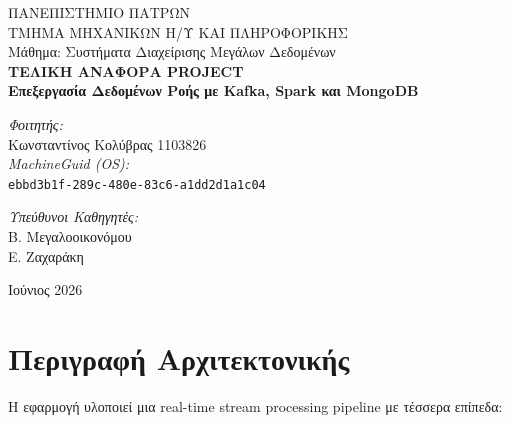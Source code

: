 \documentclass[11pt,a4paper]{article}
\begin{document}

\begin{titlepage}
    \centering
    \vspace*{1.5cm}
    {\large ΠΑΝΕΠΙΣΤΗΜΙΟ ΠΑΤΡΩΝ}\\[0.2cm]
    {\large ΤΜΗΜΑ ΜΗΧΑΝΙΚΩΝ Η/Υ ΚΑΙ ΠΛΗΡΟΦΟΡΙΚΗΣ}\\[1.5cm]
    {\large Μάθημα: Συστήματα Διαχείρισης Μεγάλων Δεδομένων}\\[2cm]
    {\Large \bfseries ΤΕΛΙΚΗ ΑΝΑΦΟΡΑ \textlatin{PROJECT}}\\[0.5cm]
    {\Large \bfseries Επεξεργασία Δεδομένων Ροής με \textlatin{Kafka}, \textlatin{Spark} και \textlatin{MongoDB}}\\[2.5cm]
    \begin{minipage}{0.45\textwidth}
        \begin{flushleft}\large
            \emph{Φοιτητής:}\\
            Κωνσταντίνος Κολύβρας 1103826\\[0.3cm]
            \emph{\textlatin{MachineGuid (OS)}:}\\
            \texttt{\textlatin{ebbd3b1f-289c-480e-83c6-a1dd2d1a1c04}}
        \end{flushleft}
    \end{minipage}
    \hfill
    \begin{minipage}{0.45\textwidth}
        \begin{flushright}\large
            \emph{Υπεύθυνοι Καθηγητές:}\\
            Β. Μεγαλοοικονόμου\\
            Ε. Ζαχαράκη
        \end{flushright}
    \end{minipage}
    \vfill
    {\large Ιούνιος 2026}
\end{titlepage}

\section{Περιγραφή Αρχιτεκτονικής}

Η εφαρμογή υλοποιεί μια \textlatin{real-time stream processing pipeline} με τέσσερα επίπεδα:
\end{document}
